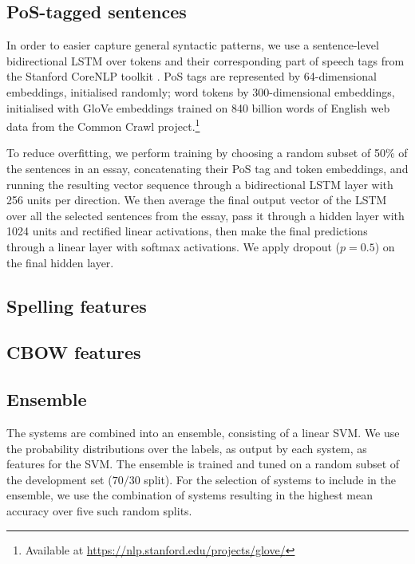 \documentclass[11pt,letterpaper]{article}
\begin{document}
\subsection{PoS-tagged sentences}
In order to easier capture general syntactic patterns, we use a sentence-level
bidirectional LSTM over tokens and their corresponding part of speech tags
from the Stanford CoreNLP toolkit \citep{Manning2014corenlp}.  PoS tags are
represented by
64-dimensional embeddings, initialised randomly;  word tokens by
300-dimensional embeddings, initialised with GloVe \citep{Pennington2014glove}
embeddings trained on 840 billion words of English web data from the Common
Crawl project.\footnote{ Available at
\url{https://nlp.stanford.edu/projects/glove/}}

To reduce overfitting, we perform training by choosing a random subset of 50\%
of the sentences in an essay, concatenating their PoS tag and token
embeddings, and running the resulting vector sequence through a bidirectional
LSTM layer with 256 units per direction. We then average the final output
vector of the LSTM over all the selected sentences from the essay, pass it
through a hidden layer with 1024 units and rectified linear activations, then
make the final predictions through a linear layer with softmax activations.
We apply dropout ($p = 0.5$) on the final hidden layer.

\subsection{Spelling features}

\subsection{CBOW features}

\subsection{Ensemble}
The systems are combined into an ensemble, consisting of a linear SVM.
We use the probability distributions over the labels, as output by each system, as features for the SVM.
The ensemble is trained and tuned on a random subset of the development set ($70/30$ split).
For the selection of systems to include in the ensemble, we use the combination of systems resulting in the highest mean accuracy over five such random splits.
\end{document}

